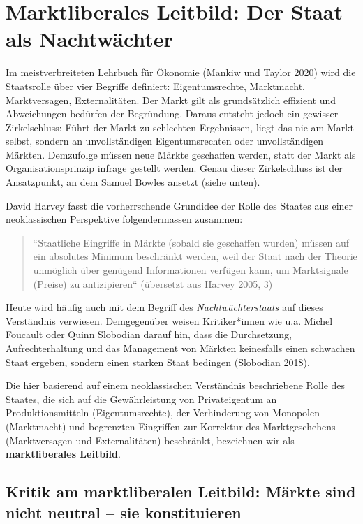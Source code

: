 \documentclass[
  nswissgerman,
  a4paper,
  DIV=11,
  numbers=noendperiod,
  oneside,
  openany]{scrreprt}
\begin{document}
\section{Marktliberales Leitbild: Der Staat als
Nachtwächter}\label{marktliberales-leitbild-der-staat-als-nachtwuxe4chter}

Im meistverbreiteten Lehrbuch für Ökonomie (Mankiw und Taylor 2020) wird
die Staatsrolle über vier Begriffe definiert: Eigentumsrechte,
Marktmacht, Marktversagen, Externalitäten. Der Markt gilt als
grundsätzlich effizient und Abweichungen bedürfen der Begründung. Daraus
entsteht jedoch ein gewisser Zirkelschluss: Führt der Markt zu
schlechten Ergebnissen, liegt das nie am Markt selbst, sondern an
unvollständigen Eigentumsrechten oder unvollständigen Märkten.
Demzufolge müssen neue Märkte geschaffen werden, statt der Markt als
Organisationsprinzip infrage gestellt werden. Genau dieser Zirkelschluss
ist der Ansatzpunkt, an dem Samuel Bowles ansetzt (siehe unten).

David Harvey fasst die vorherrschende Grundidee der Rolle des Staates
aus einer neoklassischen Perspektive folgendermassen zusammen:

\begin{quote}
``Staatliche Eingriffe in Märkte (sobald sie geschaffen wurden) müssen
auf ein absolutes Minimum beschränkt werden, weil der Staat nach der
Theorie unmöglich über genügend Informationen verfügen kann, um
Marktsignale (Preise) zu antizipieren`` (übersetzt aus Harvey 2005, 3)
\end{quote}

Heute wird häufig auch mit dem Begriff des \emph{Nachtwächterstaats} auf
dieses Verständnis verwiesen. Demgegenüber weisen Kritiker*innen wie
u.a. Michel Foucault oder Quinn Slobodian darauf hin, dass die
Durchsetzung, Aufrechterhaltung und das Management von Märkten
keinesfalls einen schwachen Staat ergeben, sondern einen starken Staat
bedingen (Slobodian 2018).

Die hier basierend auf einem neoklassischen Verständnis beschriebene
Rolle des Staates, die sich auf die Gewährleistung von Privateigentum an
Produktionsmitteln (Eigentumsrechte), der Verhinderung von Monopolen
(Marktmacht) und begrenzten Eingriffen zur Korrektur des Marktgeschehens
(Marktversagen und Externalitäten) beschränkt, bezeichnen wir als
\textbf{marktliberales Leitbild}.

\subsection{Kritik am marktliberalen Leitbild: Märkte sind nicht neutral
-- sie
konstituieren}\label{kritik-am-marktliberalen-leitbild-muxe4rkte-sind-nicht-neutral-sie-konstituieren}
\end{document}
